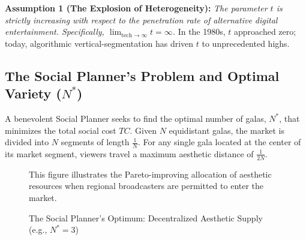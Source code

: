 \documentclass[AER]{AEA}
\begin{document}
\textbf{Assumption 1 (The Explosion of Heterogeneity):} \textit{The parameter $t$ is strictly increasing with respect to the penetration rate of alternative digital entertainment. Specifically, $\lim_{\text{tech} \to \infty} t = \infty$.} In the 1980s, $t$ approached zero; today, algorithmic vertical-segmentation has driven $t$ to unprecedented highs.

\subsection{The Social Planner's Problem and Optimal Variety ($N^*$)}

A benevolent Social Planner seeks to find the optimal number of galas, $N^*$, that minimizes the total social cost $TC$. Given $N$ equidistant galas, the market is divided into $N$ segments of length $\frac{1}{N}$. For any single gala located at the center of its market segment, viewers travel a maximum aesthetic distance of $\frac{1}{2N}$.

\begin{figure}[ht]
\centering
{}
\caption{The Social Planner's Optimum: Decentralized Aesthetic Supply (e.g., $N^*=3$)}
\begin{figurenotes}
This figure illustrates the Pareto-improving allocation of aesthetic resources when regional broadcasters are permitted to enter the market.
\end{figurenotes}
\end{figure}
\end{document}
